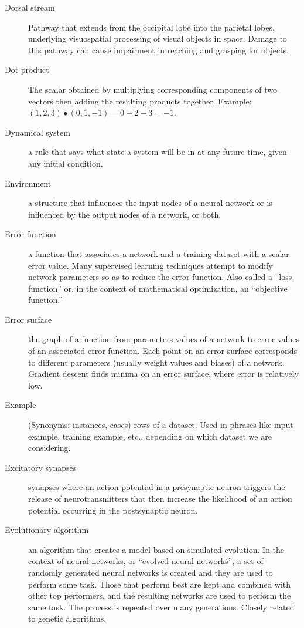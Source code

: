 \begin{description}
\item[Dorsal stream] Pathway that extends from the occipital lobe into the parietal lobes, underlying visuospatial processing of visual objects in space. Damage to this pathway can cause impairment in reaching and grasping for objects. 

\item[Dot product] The scalar obtained by multiplying corresponding components of two vectors then adding the resulting products together. Example: $(1,2,3) \bullet (0,1,-1) = 0+2-3 = -1$.

\item[Dynamical system] a rule that says what state a system will be in at any future time, given any initial condition.

\item[Environment] a structure that influences the input nodes of a neural network or is influenced by the output nodes of a network, or both.

\item[Error function] a function that associates a network and a training dataset with a scalar error value. Many supervised learning techniques attempt to modify network parameters so as to reduce the error function. Also called a ``loss function'' or, in the context of mathematical optimization, an ``objective function.''

\item[Error surface] the graph of a function from parameters values of a network to error values of an associated error function. Each point on an error surface corresponds to different parameters (usually weight values and biases) of a network. Gradient descent finds minima on an error surface, where error is relatively low.

\item[Example] (Synonyms: instances, cases) rows of a dataset. Used in phrases like input example, training example, etc., depending on which dataset we are considering.

\item[Excitatory synapses] synapses where an action potential in a presynaptic neuron triggers the release of neurotransmitters that then increase the likelihood of an action potential occurring in the postsynaptic neuron.

\item[Evolutionary algorithm] an algorithm that creates a model based on simulated evolution. In the context of neural networks, or ``evolved neural networks'', a set of randomly generated neural networks is created and they are used to perform some task.  Those that perform best are kept and combined with other top performers, and the resulting networks are used to perform the same task. The process is repeated over many generations. Closely related to genetic algorithms.


\end{description}
